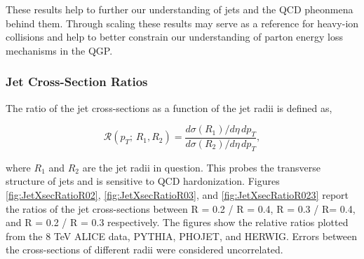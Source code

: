 These results help to further our understanding of jets and the QCD pheonmena behind them.  Through scaling these results may serve as a reference for heavy-ion collisions and help to better constrain our understanding of parton energy loss mechanisms in the QGP.  


\subsubsection{Jet Cross-Section Ratios}


\noindent
The ratio of the jet cross-sections as a function of the jet radii is defined as,

\begin{equation}
\mathscr{R} (p_{T}; \, R_{1},R_{2}) = \frac{d\sigma(R_{1}) /d\eta \, dp_{T} }{d\sigma (R_{2}) /d\eta \, dp_{T}},
\label{eq:jetxsecratio}
\end{equation}

\noindent
where $R_{1}$ and $R_{2}$ are the jet radii in question. This probes the transverse structure of jets and is sensitive to QCD hardonization\cite{SOYEZ201159}.  Figures \ref{fig:JetXsecRatioR02}, \ref{fig:JetXsecRatioR03}, and \ref{fig:JetXsecRatioR023} report the ratios of the jet cross-sections between R = 0.2 / R = 0.4, R = 0.3 / R= 0.4, and R = 0.2 / R = 0.3 respectively.  The figures show the relative ratios plotted from the 8 TeV ALICE data, PYTHIA, PHOJET, and HERWIG.  Errors between the cross-sections of different radii were considered uncorrelated.



